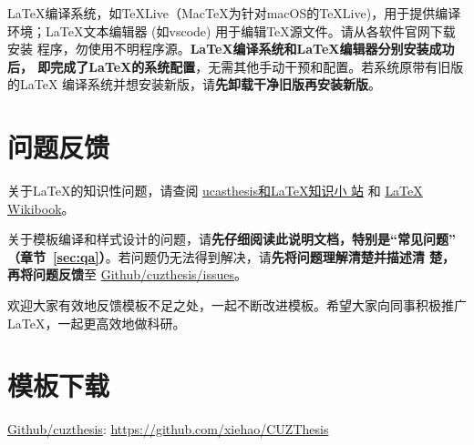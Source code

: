 \LaTeX{}编译系统，如\TeX{}Live（Mac\TeX{}为针对macOS的\TeX{}Live)，用于提供编译
环境；\LaTeX{}文本编辑器 (如vscode) 用于编辑\TeX{}源文件。请从各软件官网下载安装
程序，勿使用不明程序源。\textbf{\LaTeX{}编译系统和\LaTeX{}编辑器分别安装成功后，
即完成了\LaTeX{}的系统配置}，无需其他手动干预和配置。若系统原带有旧版的\LaTeX{}
编译系统并想安装新版，请\textbf{先卸载干净旧版再安装新版}。

\section{问题反馈}

关于\LaTeX{}的知识性问题，请查阅
\href{https://github.com/mohuangrui/ucasthesis/wiki}{ucasthesis和\LaTeX{}知识小
站} 和 \href{https://en.wikibooks.org/wiki/LaTeX}{\LaTeX{} Wikibook}。

关于模板编译和样式设计的问题，请\textbf{先仔细阅读此说明文档，特别是“常见问题”
（章节~\ref{sec:qa}）}。若问题仍无法得到解决，请\textbf{先将问题理解清楚并描述清
楚，再将问题反馈}至
\href{https://github.com/xiehao/CUZThesis/issues}{Github/cuzthesis/issues}。

欢迎大家有效地反馈模板不足之处，一起不断改进模板。希望大家向同事积极推广
\LaTeX{}，一起更高效地做科研。

\section{模板下载}

\begin{center}
    \href{https://github.com/xiehao/CUZThesis}{Github/cuzthesis}: \url{https://github.com/xiehao/CUZThesis}
\end{center}
